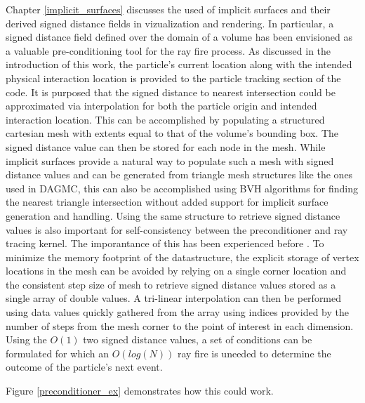 \documentclass[12pt, a4paper]{article}
\begin{document}
Chapter \ref{implicit_surfaces} discusses the used of implicit surfaces and their derived signed distance fields in vizualization and rendering. In particular, a signed distance field defined over the domain of a volume has been envisioned as a valuable pre-conditioning tool for the ray fire process. As discussed in the introduction of this work, the particle's current location along with the intended physical interaction location is provided to the particle tracking section of the code. It is purposed that the signed distance to nearest intersection could be approximated via interpolation for both the particle origin and intended interaction location. This can be accomplished by populating a structured cartesian mesh with extents equal to that of the volume's bounding box. The signed distance value can then be stored for each node in the mesh. While implicit surfaces provide a natural way to populate such a mesh with signed distance values and can be generated from triangle mesh structures like the ones used in DAGMC, this can also be accomplished using BVH algorithms for finding the nearest triangle intersection without added support for implicit surface generation and handling. Using the same structure to retrieve signed distance values is also important for self-consistency between the preconditioner and ray tracing kernel. The imporantance of this has been experienced before \cite{Smith_2011}. To minimize the memory footprint of the datastructure, the explicit storage of vertex locations in the mesh can be avoided by relying on a single corner location and the consistent step size of mesh to retrieve signed distance values stored as a single array of double values. A tri-linear interpolation can then be performed using data values quickly gathered from the array using indices provided by the number of steps from the mesh corner to the point of interest in each dimension. Using the $O(1)$ two signed distance values, a set of conditions can be formulated for which an $O(log(N))$ ray fire is uneeded to determine the outcome of the particle's next event.

Figure \ref{preconditioner_ex} demonstrates how this could work. 
\end{document}
